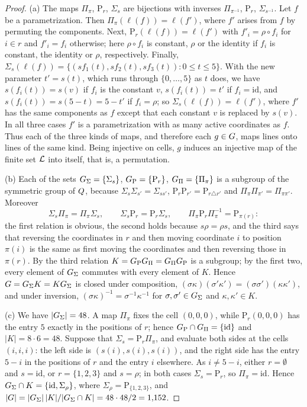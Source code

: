 \begin{proof}
(a) The maps $\Pi_\pi$, $\mathrm{P}_r$, $\Sigma_s$ are bijections with inverses $\Pi_{\pi^{-1}}$,
$\mathrm{P}_r$, $\Sigma_{s^{-1}}$. Let $f$ be a parametrization. Then $\Pi_\pi(\ell(f))=\ell(f')$, where
$f'$ arises from $f$ by permuting the components. Next, $\mathrm{P}_r(\ell(f))=\ell(f')$ with
$f'_i=\rho\circ f_i$ for $i\in r$ and $f'_i=f_i$ otherwise; here $\rho\circ f_i$ is constant, $\rho$ or the
identity if $f_i$ is constant, the identity or $\rho$, respectively. Finally,
$\Sigma_s(\ell(f))=\{(s f_1(t),s f_2(t),s f_3(t)):0\le t\le 5\}$. With the new parameter $t'=s(t)$, which
runs through $\{0,\dots,5\}$ as $t$ does, we have $s(f_i(t))=s(v)$ if $f_i$ is the constant $v$,
$s(f_i(t))=t'$ if $f_i=\mathrm{id}$, and $s(f_i(t))=s(5-t)=5-t'$ if $f_i=\rho$; so
$\Sigma_s(\ell(f))=\ell(f')$, where $f'$ has the same components as $f$ except that each constant $v$ is
replaced by $s(v)$. In all three cases $f'$ is a parametrization with as many active coordinates as $f$.
Thus each of the three kinds of maps, and therefore each $g\in G$, maps lines onto lines of the same kind.
Being injective on cells, $g$ induces an injective map of the finite set $\mathcal{L}$ into itself, that is, a
permutation.

(b) Each of the sets $G_\Sigma=\{\Sigma_s\}$, $G_{\mathrm P}=\{\mathrm{P}_r\}$, $G_\Pi=\{\Pi_\pi\}$ is a
subgroup of the symmetric group of $Q$, because $\Sigma_s\Sigma_{s'}=\Sigma_{ss'}$,
$\mathrm{P}_r\mathrm{P}_{r'}=\mathrm{P}_{r\triangle r'}$ and $\Pi_\pi\Pi_{\pi'}=\Pi_{\pi\pi'}$. Moreover
\[
  \Sigma_s\Pi_\pi=\Pi_\pi\Sigma_s,\qquad \Sigma_s\mathrm{P}_r=\mathrm{P}_r\Sigma_s,\qquad
  \Pi_\pi\mathrm{P}_r\Pi_\pi^{-1}=\mathrm{P}_{\pi(r)}:
\]
the first relation is obvious, the second holds because $s\rho=\rho s$, and the third says that reversing
the coordinates in $r$ and then moving coordinate $i$ to position $\pi(i)$ is the same as first moving
the coordinates and then reversing those in $\pi(r)$. By the third relation
$K=G_{\mathrm P}G_\Pi=G_\Pi G_{\mathrm P}$ is a subgroup; by the first two, every element of $G_\Sigma$
commutes with every element of $K$. Hence $G=G_\Sigma K=KG_\Sigma$ is closed under composition,
$(\sigma\kappa)(\sigma'\kappa')=(\sigma\sigma')(\kappa\kappa')$, and under inversion,
$(\sigma\kappa)^{-1}=\sigma^{-1}\kappa^{-1}$ for $\sigma,\sigma'\in G_\Sigma$ and $\kappa,\kappa'\in K$.

(c) We have $|G_\Sigma|=48$. A map $\Pi_\pi$ fixes the cell $(0,0,0)$, while $\mathrm{P}_r(0,0,0)$ has the
entry $5$ exactly in the positions of $r$; hence $G_{\mathrm P}\cap G_\Pi=\{\mathrm{id}\}$ and
$|K|=8\cdot 6=48$. Suppose that $\Sigma_s=\mathrm{P}_r\Pi_\pi$, and evaluate both sides at the cells
$(i,i,i)$: the left side is $(s(i),s(i),s(i))$, and the right side has the entry $5-i$ in the positions of
$r$ and the entry $i$ elsewhere. As $i\ne 5-i$, either $r=\emptyset$ and $s=\mathrm{id}$, or $r=\{1,2,3\}$
and $s=\rho$; in both cases $\Sigma_s=\mathrm{P}_r$, so $\Pi_\pi=\mathrm{id}$. Hence
$G_\Sigma\cap K=\{\mathrm{id},\Sigma_\rho\}$, where $\Sigma_\rho=\mathrm{P}_{\{1,2,3\}}$, and
$|G|=|G_\Sigma|\,|K|/|G_\Sigma\cap K|=48\cdot 48/2=1{,}152$.


\end{proof}
